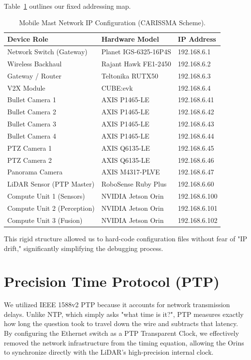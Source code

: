 \documentclass[12pt,a4paper]{report}
\begin{document}
{Table~\ref{tab:network-ips} outlines our fixed addressing map.

\begin{table}[H]
\centering
\caption{Mobile Mast Network IP Configuration (CARISSMA Scheme).}
\label{tab:network-ips}
\begin{tabular}{l l l}
\toprule
\textbf{Device Role} & \textbf{Hardware Model} & \textbf{IP Address} \\
\midrule
Network Switch (Gateway) & Planet IGS-6325-16P4S & 192.168.6.1 \\
Wireless Backhaul & Rajant Hawk FE1-2450 & 192.168.6.2 \\
Gateway / Router & Teltonika RUTX50 & 192.168.6.3 \\
V2X Module & CUBE:evk & 192.168.6.4 \\
\midrule
Bullet Camera 1 & AXIS P1465-LE & 192.168.6.41 \\
Bullet Camera 2 & AXIS P1465-LE & 192.168.6.42 \\
Bullet Camera 3 & AXIS P1465-LE & 192.168.6.43 \\
Bullet Camera 4 & AXIS P1465-LE & 192.168.6.44 \\
PTZ Camera 1 & AXIS Q6135-LE & 192.168.6.45 \\
PTZ Camera 2 & AXIS Q6135-LE & 192.168.6.46 \\
Panorama Camera & AXIS M4317-PLVE & 192.168.6.47 \\
\midrule
LiDAR Sensor (PTP Master) & RoboSense Ruby Plus & 192.168.6.60 \\
\midrule
Compute Unit 1 (Sensors) & NVIDIA Jetson Orin & 192.168.6.100 \\
Compute Unit 2 (Perception) & NVIDIA Jetson Orin & 192.168.6.101 \\
Compute Unit 3 (Fusion) & NVIDIA Jetson Orin & 192.168.6.102 \\
\bottomrule
\end{tabular}
\end{table}

This rigid structure allowed us to hard-code configuration files without fear of "IP drift," significantly simplifying the debugging process.

\section{Precision Time Protocol (PTP)}
We utilized IEEE 1588v2 PTP because it accounts for network transmission delays. Unlike NTP, which simply asks "what time is it?", PTP measures exactly how long the question took to travel down the wire and subtracts that latency. By configuring the Ethernet switch as a PTP Transparent Clock, we effectively removed the network infrastructure from the timing equation, allowing the Orins to synchronize directly with the LiDAR's high-precision internal clock.

}
\end{document}
